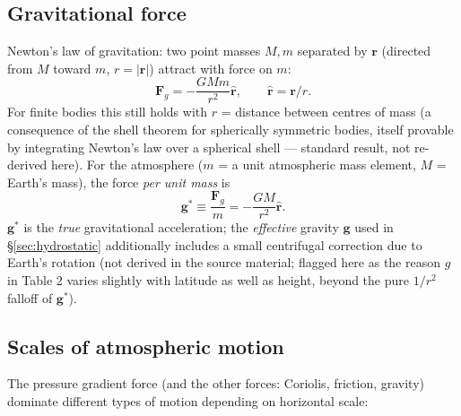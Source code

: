 \documentclass[11pt]{article}
\begin{document}
\subsection{Gravitational force}
Newton's law of gravitation: two point masses $M,m$ separated by $\mathbf r$ (directed from $M$ toward $m$, $r=|\mathbf r|$) attract with force on $m$:
\begin{equation}
\mathbf F_g = -\frac{GMm}{r^2}\hat{\mathbf r}, \qquad \hat{\mathbf r}=\mathbf r/r.
\end{equation}
For finite bodies this still holds with $r$ = distance between centres of mass (a consequence of the shell theorem for spherically symmetric bodies, itself provable by integrating Newton's law over a spherical shell — standard result, not re-derived here). For the atmosphere ($m$ = a unit atmospheric mass element, $M$ = Earth's mass), the force \emph{per unit mass} is
\begin{equation}
\mathbf g^{*} \equiv \frac{\mathbf F_g}{m} = -\frac{GM}{r^2}\hat{\mathbf r}.
\label{eq:gravity}
\end{equation}
$\mathbf g^*$ is the \emph{true} gravitational acceleration; the \emph{effective} gravity $\mathbf g$ used in \S\ref{sec:hydrostatic} additionally includes a small centrifugal correction due to Earth's rotation (not derived in the source material; flagged here as the reason $g$ in Table 2 varies slightly with latitude as well as height, beyond the pure $1/r^2$ falloff of $\mathbf g^*$).

\subsection{Scales of atmospheric motion}
The pressure gradient force (and the other forces: Coriolis, friction, gravity) dominate different types of motion depending on horizontal scale:
\end{document}
